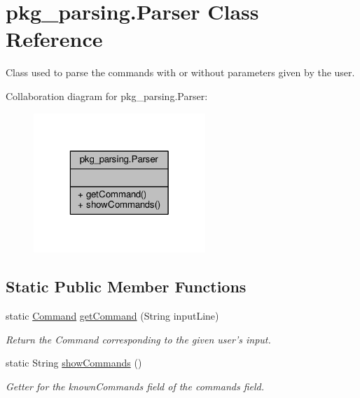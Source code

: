 \hypertarget{classpkg__parsing_1_1Parser}{\section{pkg\-\_\-parsing.\-Parser Class Reference}
\label{classpkg__parsing_1_1Parser}
}


Class used to parse the commands with or without parameters given by the user.  




Collaboration diagram for pkg\-\_\-parsing.\-Parser\-:\nopagebreak
\begin{figure}[H]
\begin{center}
\leavevmode
\includegraphics[width=184pt]{classpkg__parsing_1_1Parser__coll__graph}
\end{center}
\end{figure}
\subsection*{Static Public Member Functions}
\begin{DoxyCompactItemize}
\item 
static \hyperlink{classpkg__commands_1_1Command}{Command} \hyperlink{classpkg__parsing_1_1Parser_a3baac59980671aeb689ca25fba64e9cc}{get\-Command} (String input\-Line)
\begin{DoxyCompactList}\small\item\em Return the Command corresponding to the given user's input. \end{DoxyCompactList}\item 
static String \hyperlink{classpkg__parsing_1_1Parser_a31545cdbdb409aaeb727289c0ea7be1b}{show\-Commands} ()
\begin{DoxyCompactList}\small\item\em Getter for the known\-Commands field of the commands field. \end{DoxyCompactList}\end{DoxyCompactItemize}


